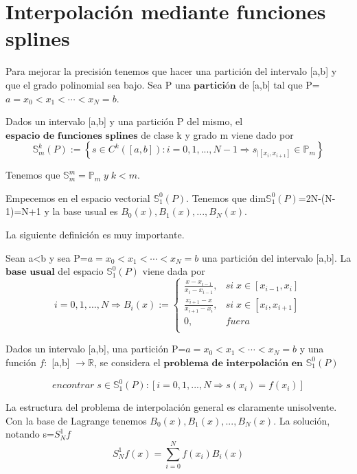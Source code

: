 \section{Interpolación mediante funciones splines}
Para mejorar la precisión tenemos que hacer una partición del intervalo [a,b] y que el grado polinomial sea bajo. Sea P una $\textbf{partición}$ de [a,b] tal que P={$a=x_0 < x_1 < \cdots < x_N = b$}.

\begin{ndef}
Dados un intervalo [a,b] y una partición P del mismo, el $\textbf{espacio de funciones splines}$ de clase k y grado m viene dado por
\[ \mathbb{S}_m^k(P) := \left\lbrace s \in C^k ( \left[ a,b \right] ) : i=0,1,...,N-1 \Rightarrow s_{\vert \left[ x_i, x_{i+1} \right]} \in \mathbb{P} _m \right\rbrace \]
\end{ndef}

Tenemos que $\mathbb{S}_m^m = \mathbb{P}_m \; y \; k<m$.

Empecemos en el espacio vectorial $\mathbb{S}_1^0(P)$. Tenemos que dim$\mathbb{S}_1^0(P)$=2N-(N-1)=N+1 y la base usual es {$B_0(x),B_1(x),...,B_N(x)$}.

La siguiente definición es muy importante.

\begin{ndef}
Sean a<b y sea P={$a=x_0<x_1<\cdots < x_N=b$} una partición del intervalo [a,b]. La $\textbf{base usual}$ del espacio $\mathbb{S}_1^0(P)$ viene dada por
\[ i=0,1,...,N \Rightarrow B_i(x) := \left\lbrace
\begin{array}{ll}
\frac{x-x_{i-1}}{x_i-x_{i-1}}, & si \; x \in \left[ x_{i-1},x_i \right] \\
\frac{x_{i+1}-x}{x_{i+1}-x_i}, & si \; x \in \left[ x_i,x_{i+1} \right] \\
0, & fuera \\
\end{array}
\right.
\]
\end{ndef}

Dados un intervalo [a,b], una partición P={$a=x_0<x_1<\cdots < x_N=b$} y una función $f:$ [a,b] $\longrightarrow \mathbb{R}$, se considera el $\textbf{problema de interpolación en}$ $\mathbb{S}_1^0(P)$

\[encontrar \; s \in \mathbb{S}_1^0(P) : \left[ i=0,1,...,N \Rightarrow s(x_i) = f(x_i) \right] \]

La estructura del problema de interpolación general es claramente unisolvente. Con la base de Lagrange tenemos {$B_0(x), B_1(x),...,B_N(x)$}. La solución, notando s=$S_N^1f$
\[ S_N^1f(x) = \sum_{i=0}^N f(x_i)B_i(x) \]

